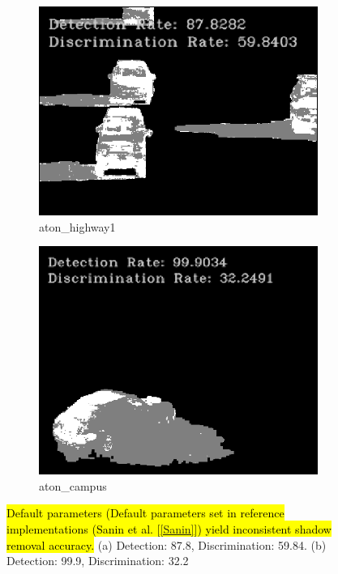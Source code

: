 \begin{figure}
  \centering
  \begin{subfigure}{.49\linewidth}
    \includegraphics[width=1\linewidth]{figures/background/phys_highway1_200.png}
    \caption{aton\_highway1}
  \end{subfigure}
  \hfill
  \begin{subfigure}{.45\linewidth}
    \includegraphics[width=1\linewidth]{figures/background/phys_campus_200.png}
    \caption{aton\_campus}
  \end{subfigure}
  \caption{\hl{Default parameters (Default parameters set in reference implementations (Sanin et al. [\ref{Sanin}]) yield inconsistent shadow removal accuracy.} (a) Detection: 87.8, Discrimination: 59.84. (b) Detection: 99.9, Discrimination: 32.2}
  \label{fig:coner102}
\end{figure}

